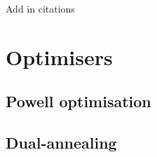 Add in citations \cite{khaneja_optimal_2005}

\section{Optimisers}

\subsection{Powell optimisation}

\subsection{Dual-annealing}